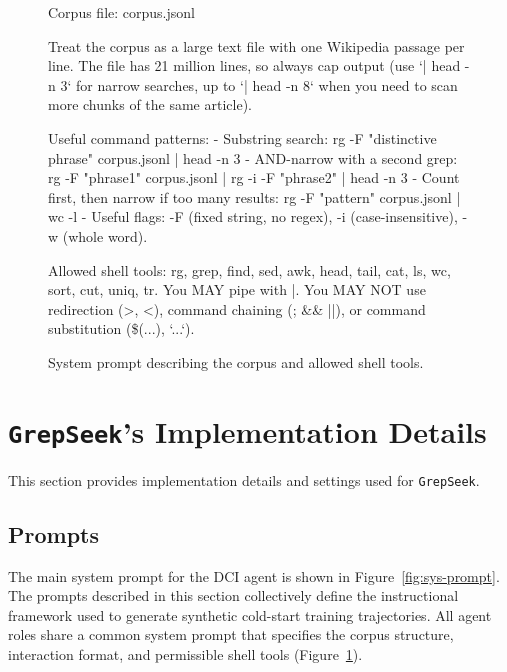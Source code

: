 \documentclass{llmxive}
\providecommand{\ourmethod}{\texttt{GrepSeek}\xspace}
\begin{document}
\begin{figure}[!t]
\begin{promptbox}
Corpus file: corpus.jsonl

Treat the corpus as a large text file with one Wikipedia passage per line. The file has 21 million lines, so always cap output (use `| head -n 3` for narrow searches, up to `| head -n 8` when you need to scan more chunks of the same article).

Useful command patterns:
- Substring search:
    rg -F "distinctive phrase" corpus.jsonl | head -n 3
- AND-narrow with a second grep:
    rg -F "phrase1" corpus.jsonl | rg -i -F "phrase2" | head -n 3
- Count first, then narrow if too many results:
    rg -F "pattern" corpus.jsonl | wc -l
- Useful flags: -F (fixed string, no regex), -i (case-insensitive), -w (whole word).

Allowed shell tools: rg, grep, find, sed, awk, head, tail, cat, ls, wc, sort, cut, uniq, tr.
You MAY pipe with |. You MAY NOT use redirection (>, <), command chaining (; && ||), or command substitution (\$(...), `...`).
\end{promptbox}
\vspace{-0.4cm}
\caption{System prompt describing the corpus and allowed shell tools.}
\label{fig:prompt_corpus_desc}
\end{figure}


\section{\ourmethod's Implementation Details}
\label{app:our-implementation}

This section provides implementation details and settings used for \ourmethod.

\subsection{Prompts}

The main system prompt for the DCI agent is shown in Figure~\ref{fig:sys-prompt}. The prompts described in this section collectively define the instructional framework used to generate synthetic cold-start training trajectories. All agent roles share a common system prompt that specifies the corpus structure, interaction format, and permissible shell tools (Figure~\ref{fig:prompt_corpus_desc}).
\end{document}
